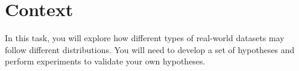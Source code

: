 \section*{Context}

In this task, you will explore how different types of real-world datasets may follow different distributions. You will need to develop a set of hypotheses and perform experiments to validate your own hypotheses. 
